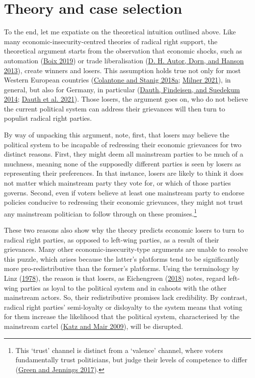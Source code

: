 \documentclass[
]{article}
\begin{document}
\hypertarget{theory}{%
\section{Theory and case selection}\label{theory}}

To the end, let me expatiate on the theoretical intuition outlined
above. Like many economic-insecurity-centred theories of radical right
support, the theoretical argument starts from the observation that
economic shocks, such as automation
(\protect\hyperlink{ref-boix_democratic_2019}{Boix 2019}) or trade
liberalisation (\protect\hyperlink{ref-autor_china_2013}{D. H. Autor,
Dorn, and Hanson 2013}), create winners and losers. This assumption
holds true not only for most Western European countries
(\protect\hyperlink{ref-colantone_trade_2018}{Colantone and Stanig
2018a}; \protect\hyperlink{ref-milner_voting_2021}{Milner 2021}), in
general, but also for Germany, in particular
(\protect\hyperlink{ref-dauth_rise_2014}{Dauth, Findeisen, and Suedekum
2014}; \protect\hyperlink{ref-dauth_adjustment_2021}{Dauth et al.
2021}). Those losers, the argument goes on, who do not believe the
current political system can address their grievances will then turn to
populist radical right parties.

By way of unpacking this argument, note, first, that losers may believe
the political system to be incapable of redressing their economic
grievances for two distinct reasons. First, they might deem all
mainstream parties to be much of a muchness, meaning none of the
supposedly different parties is seen by losers as representing their
preferences. In that instance, losers are likely to think it does not
matter which mainstream party they vote for, or which of those parties
governs. Second, even if voters believe at least one mainstream party to
endorse policies conducive to redressing their economic grievances, they
might not trust any mainstream politician to follow through on these
promises.\footnote{This `trust' channel is distinct from a `valence'
  channel, where voters fundamentally trust politicians, but judge their
  levels of competence to differ
  (\protect\hyperlink{ref-green_politics_2017}{Green and Jennings
  2017}).}

These two reasons also show why the theory predicts economic losers to
turn to radical right parties, as opposed to left-wing parties, as a
result of their grievances. Many other economic-insecurity-type
arguments are unable to resolve this puzzle, which arises because the
latter's platforms tend to be significantly more pro-redistributive than
the former's platforms. Using the terminology by Linz
(\protect\hyperlink{ref-linz_breakdown_1978}{1978}), the reason is that
losers, as Eichengreen
(\protect\hyperlink{ref-eichengreen_populist_2018}{2018}) notes, regard
left-wing parties as loyal to the political system and in cahoots with
the other mainstream actors. So, their redistributive promises lack
credibility. By contrast, radical right parties' semi-loyalty or
disloyalty to the system means that voting for them increase the
likelihood that the political system, characterised by the mainstream
cartel (\protect\hyperlink{ref-katz_cartel_2009}{Katz and Mair 2009}),
will be disrupted.
\end{document}
